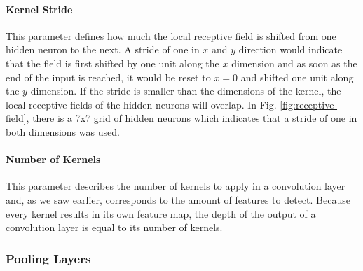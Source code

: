 \paragraph{Kernel Stride}

This parameter defines how much the local receptive field is shifted
from one hidden neuron to the next. A stride of one in \(x\) and \(y\)
direction would indicate that the field is first shifted by one unit
along the \(x\) dimension and as soon as the end of the input is
reached, it would be reset to \(x=0\) and shifted one unit along the
\(y\) dimension. If the stride is smaller than the dimensions of the
kernel, the local receptive fields of the hidden neurons will overlap.
In Fig. \ref{fig:receptive-field}, there is a 7x7 grid of hidden
neurons which indicates that a stride of one in both dimensions was
used.

\paragraph{Number of Kernels}

This parameter describes the number of kernels to apply in a
convolution layer and, as we saw earlier, corresponds to the amount of
features to detect. Because every kernel results in its own feature
map, the depth of the output of a convolution layer is equal to its
number of kernels.

\subsubsection{Pooling Layers}

